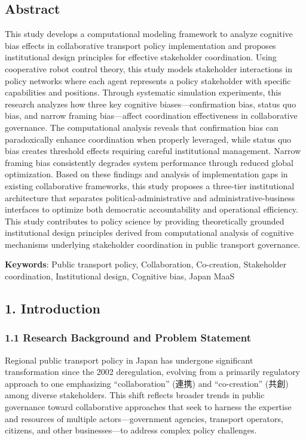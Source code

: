 \subsection{Abstract}\label{abstract}

This study develops a computational modeling framework to analyze
cognitive bias effects in collaborative transport policy implementation
and proposes institutional design principles for effective stakeholder
coordination. Using cooperative robot control theory, this study models
stakeholder interactions in policy networks where each agent represents
a policy stakeholder with specific capabilities and positions. Through
systematic simulation experiments, this research analyzes how three key
cognitive biases---confirmation bias, status quo bias, and narrow
framing bias---affect coordination effectiveness in collaborative
governance. The computational analysis reveals that confirmation bias
can paradoxically enhance coordination when properly leveraged, while
status quo bias creates threshold effects requiring careful
institutional management. Narrow framing bias consistently degrades
system performance through reduced global optimization. Based on these
findings and analysis of implementation gaps in existing collaborative
frameworks, this study proposes a three-tier institutional architecture
that separates political-administrative and administrative-business
interfaces to optimize both democratic accountability and operational
efficiency. This study contributes to policy science by providing
theoretically grounded institutional design principles derived from
computational analysis of cognitive mechanisms underlying stakeholder
coordination in public transport governance.

\textbf{Keywords}: Public transport policy, Collaboration, Co-creation,
Stakeholder coordination, Institutional design, Cognitive bias, Japan
MaaS

\subsection{1. Introduction}\label{introduction}

\subsubsection{1.1 Research Background and Problem
Statement}\label{research-background-and-problem-statement}

Regional public transport policy in Japan has undergone significant
transformation since the 2002 deregulation, evolving from a primarily
regulatory approach to one emphasizing ``collaboration'' (連携) and
``co-creation'' (共創) among diverse stakeholders. This shift reflects
broader trends in public governance toward collaborative approaches that
seek to harness the expertise and resources of multiple
actors---government agencies, transport operators, citizens, and other
businesses---to address complex policy challenges.

